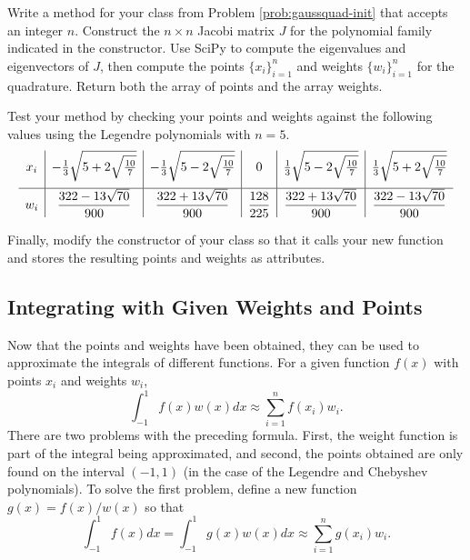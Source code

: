 
\begin{problem} %
\label{prob:jacobi}
Write a method for your class from Problem \ref{prob:gaussquad-init} that accepts an integer $n$.
Construct the $n\times n$ Jacobi matrix $J$ for the polynomial family indicated in the constructor.
Use SciPy to compute the eigenvalues and eigenvectors of $J$, then compute the points $\{x_i\}_{i=1}^n$ and weights $\{w_i\}_{i=1}^n$ for the quadrature.
Return both the array of points and the array weights.

Test your method by checking your points and weights against the following values using the Legendre polynomials with $n=5$.
{\small
\[
\centering
\begin{array}{c|c|c|c|c|c}
    x_i
    & -\frac{1}{3}\sqrt{5 + 2\sqrt{\frac{10}{7}}}
    & -\frac{1}{3}\sqrt{5 - 2\sqrt{\frac{10}{7}}}
    & 0
    & \frac{1}{3}\sqrt{5 - 2\sqrt{\frac{10}{7}}}
    & \frac{1}{3}\sqrt{5 + 2\sqrt{\frac{10}{7}}}
    \\[1em] \hline
    w_i
    & \dfrac{322-13\sqrt{70}}{900}
    & \dfrac{322+13\sqrt{70}}{900}
    & \dfrac{128}{225}
    & \dfrac{322+13\sqrt{70}}{900}
    & \dfrac{322-13\sqrt{70}}{900}
\end{array}
\]
}

Finally, modify the constructor of your class so that it calls your new function and stores the resulting points and weights as attributes.
\end{problem}

\subsection*{Integrating with Given Weights and Points} %

Now that the points and weights have been obtained, they can be used to approximate the integrals of different functions.
For a given function $f(x)$ with points $x_i$ and weights $w_i$,
\[
\int_{-1}^{1} f(x) w(x) dx \approx \sum_{i=1}^n f(x_i)w_i.
\]
There are two problems with the preceding formula.
First, the weight function is part of the integral being approximated, and second, the points obtained are only found on the interval $(-1,1)$ (in the case of the Legendre and Chebyshev polynomials).
To solve the first problem, define a new function $g(x) = f(x) / w(x)$ so that
\begin{equation}
\int_{-1}^{1} f(x) dx
= \int_{-1}^{1} g(x) w(x) dx
\approx \sum_{i=1}^n g(x_i)w_i.
\label{eq:quadrature-no-shift}
\end{equation}

